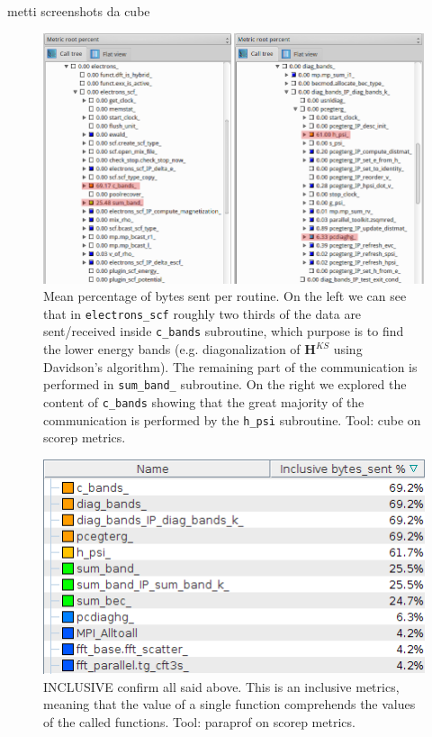 \documentclass[a4paper,12pt]{article}
\newcommand\mf[1]{\mathbf{#1}}
\begin{document}
\newpage

metti screenshots da cube

\begin{figure}[hhh!]
	\centerline{\includegraphics[scale=0.5]{cube_MPI.png}}
	\caption{Mean percentage of bytes sent per routine. 
	On the left we can see that in \texttt{electrons\_scf} roughly two thirds of the data are sent/received inside \texttt{c\_bands} subroutine, which purpose is to find the lower energy bands (e.g. diagonalization of $\mf{H}^{KS}$ using Davidson's algorithm). The remaining part of the communication is performed in \texttt{sum\_band\_} subroutine.
	On the right we explored the content of \texttt{c\_bands} showing that the great majority of the communication is performed by the \texttt{h\_psi} subroutine. Tool: cube on scorep metrics.
	}
	\label{fig:cubeMPI}
\end{figure}


\begin{figure}[hhh!]
	\centerline{\includegraphics[scale=0.5]{mpi_inclusive_bytes_sent.png}}
	\caption{ INCLUSIVE confirm all said above. This is an inclusive metrics, meaning that the value of a single function comprehends the values of the called functions. Tool: paraprof on scorep metrics.
	}
	\label{fig:MPIinclusive}
\end{figure}
\end{document}
